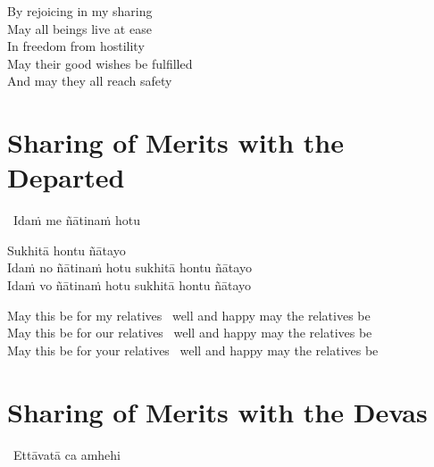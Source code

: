 \begin{english-verses}
  By rejoicing in my sharing\\
  May all beings live at ease\\
  In freedom from hostility\\
  May their good wishes be fulfilled\\
  And may they all reach safety
\end{english-verses}

\suttaRef{[Thai]}


\section{Sharing of Merits with the Departed}
\label{sharing-merits-departed}

\begin{leader-only}
\anglebracketleft\ \hspace{-0.5mm}Idaṁ me ñātinaṁ hotu \hspace{-0.5mm}\anglebracketright\
\end{leader-only}

\vspace{-1.0em}
Sukhitā hontu ñātayo\\
Idaṁ no ñātinaṁ hotu sukhitā hontu ñātayo\\
Idaṁ vo ñātinaṁ hotu sukhitā hontu ñātayo

\begin{english-verses}
  May this be for my relatives \breathmark\ well and happy may the relatives be\\
  May this be for our relatives \breathmark\ well and happy may the relatives be\\
  May this be for your relatives \breathmark\ well and happy may the relatives be
\end{english-verses}

\suttaRef{[Thai]}


\section{Sharing of Merits with the Devas}
\label{sharing-merits-devas}

\begin{leader-only}
\anglebracketleft\ \hspace{-0.5mm}Ettāvatā ca amhehi \hspace{-0.5mm}\anglebracketright\ \\
\end{leader-only}

